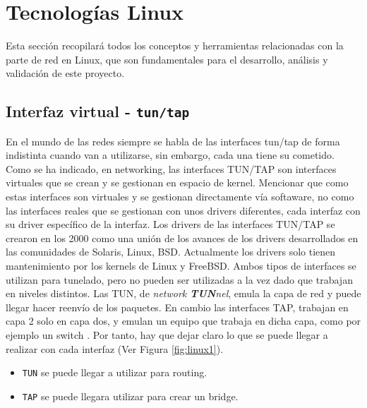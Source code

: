 \section{Tecnologías Linux}
\label{sec:linuxNetworking}

Esta sección recopilará todos los conceptos y herramientas relacionadas con la parte de red en Linux, que son fundamentales para el desarrollo, análisis y validación de este proyecto.



\subsection{Interfaz virtual - \texttt{tun/tap}}
\label{linuxNetworking_tuntap}

En el mundo de las redes siempre se habla de las interfaces tun/tap de forma indistinta cuando van a utilizarse, sin embargo, cada una tiene su cometido. Como se ha indicado, en networking, las interfaces TUN/TAP son interfaces virtuales que se crean y se gestionan en espacio de kernel. Mencionar que como estas interfaces son virtuales y se gestionan directamente vía softaware, no como las interfaces reales que se gestionan con unos drivers diferentes, cada interfaz con su driver específico de la interfaz.  Los drivers de las interfaces TUN/TAP se crearon en los 2000 como una unión de los avances de los drivers desarrollados en las comunidades de Solaris, Linux, BSD. Actualmente los drivers solo tienen mantenimiento por los kernels de Linux y FreeBSD. Ambos tipos de interfaces se utilizan para tunelado, pero no pueden ser utilizadas a la vez dado que trabajan en niveles distintos. Las TUN, de \textit{network \textbf{TUN}nel}, emula la capa de red y puede llegar hacer reenvío de los paquetes. En cambio las interfaces TAP,  trabajan en capa 2 solo en capa dos, y emulan un equipo que trabaja en dicha capa, como por ejemplo un switch \cite{tuntap1}. Por tanto, hay que dejar claro lo que se puede llegar a realizar con cada interfaz (Ver Figura \ref{fig:linux1}).

\begin{itemize}
    \item \texttt{TUN} se puede llegar a utilizar para routing.
    \item \texttt{TAP} se puede llegara utilizar para crear un bridge.
\end{itemize}

